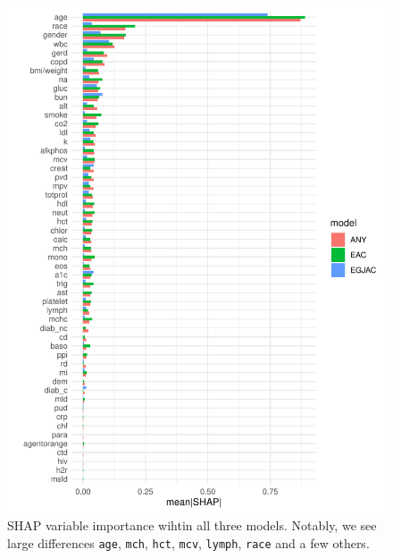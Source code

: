 \documentclass[12pt]{article}
\begin{document}
\begin{figure}[h]
\centering
\includegraphics[width=1.0\textwidth]{figures/eac_v_egjac/shap_groups_cancertype.pdf}
\caption{SHAP variable importance wihtin all three models. Notably, we see large differences
\texttt{age}, \texttt{mch}, \texttt{hct}, \texttt{mcv}, \texttt{lymph}, \texttt{race} and a few others.}
\end{figure}
\end{document}
